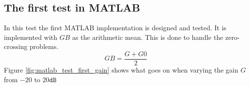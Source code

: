 \subsection{The first test in MATLAB}
In this test the first MATLAB implementation is designed and tested. 
It is implemented with $GB$ as the arithmetic mean. This is done to handle the zero-crossing problems. 
\begin{equation}
    GB = \frac{G+G0}{2}    
\end{equation}
Figure \ref{fig:matlab_test_first_gain} shows what goes on when varying the gain $G$ from $-20$ to $20\texttt{dB}$

\label{task:20140925_jm1}
